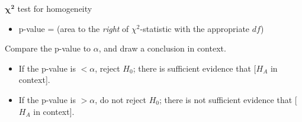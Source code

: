 \begin{onebox}{$\mathbf{\chi^2}$ test for homogeneity}
\begin{itemize}
\item[] p-value = (area to the \emph{right} of $\chi^2$-statistic with the appropriate $df$)
\end{itemize}
 Compare the p-value to $\alpha$, and draw a conclusion in context.
\begin{itemize}\vspace{-1mm}
\setlength{\itemsep}{0mm}
\item[] If the p-value is $< \alpha$, reject $H_0$; there is sufficient evidence that [$H_A$ in context]. 
\item[] If the p-value is $> \alpha$, do not reject $H_0$; there is not sufficient evidence that [$H_A$ in context].
\end{itemize}\end{onebox}


